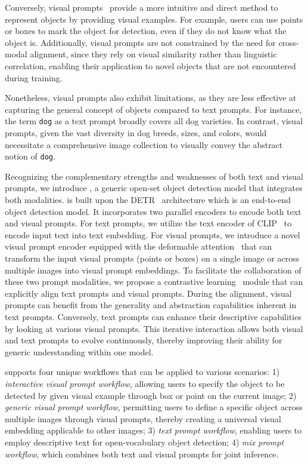 Conversely, visual prompts~\cite{xu2023multi, zou2023segment, li2023semantic, kirillov2023segment, li2023visual, jiang2023t} provide a more intuitive and direct method to represent objects by providing visual examples. For example, users can use points or boxes to mark the object for detection, even if they do not know what the object is. Additionally, visual prompts are not constrained by the need for cross-modal alignment, since they rely on visual similarity rather than linguistic correlation, enabling their application to novel objects that are not encountered during training.  

 Nonetheless, visual prompts also exhibit limitations, as they are less effective at capturing the general concept of objects compared to text prompts. For instance, the term \texttt{dog} as a text prompt broadly covers all dog varieties. In contrast, visual prompts, given the vast diversity in dog breeds, sizes, and colors, would necessitate a comprehensive image collection to visually convey the abstract notion of \texttt{dog}.

Recognizing the complementary strengths and weaknesses of both text and visual prompts, we introduce \ourmodel{}, a generic open-set object detection model that integrates both modalities. \ourmodel{} is built upon the DETR~\cite{carion2020end} architecture which is an end-to-end object detection model. It incorporates two parallel encoders to encode both text and visual prompts. For text prompts, we utilize the text encoder of CLIP~\cite{clip} to encode input text into text embedding. For visual prompts, we introduce a novel visual prompt encoder equipped with the deformable attention~\cite{zhu2020deformable} that can transform the input visual prompts (points or boxes) on a single image or across multiple images into visual prompt embeddings. To facilitate the collaboration of these two prompt modalities, we propose a contrastive learning~\cite{clip, hadsell2006dimensionality} module that can explicitly align text prompts and visual prompts. During the alignment, visual prompts can benefit from the generality and abstraction capabilities inherent in text prompts. Conversely, text prompts can enhance their descriptive capabilities by looking at various visual prompts. This iterative interaction allows both visual and text prompts to evolve continuously, thereby improving their ability for generic understanding within one model.

\ourmodel{} supports four unique workflows that can be applied to various scenarios: 1) \textit{interactive visual prompt workflow}, allowing users to specify the object to be detected by given visual example through box or point on the current image; 2) \textit{generic visual prompt workflow}, permitting users to define a specific object across multiple images through visual prompts, thereby creating a universal visual embedding applicable to other images; 3) \textit{text prompt workflow}, enabling users to employ descriptive text for open-vocabulary object detection; 4) \textit{mix prompt workflow}, which combines both text and visual prompts for joint inference. 


